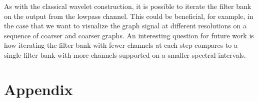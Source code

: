 \documentclass[journal, 10pt]{IEEEtran}
\begin{document}
As with the classical wavelet construction, it is possible to iterate the filter bank on the output from the lowpass channel.
This could be beneficial, for example, in the case that we want to visualize the graph signal at different resolutions on  a sequence of coarser and coarser graphs. An interesting question for future work is how iterating the filter bank with fewer channels at each step compares to a single filter bank with more channels %
supported on a smaller spectral intervals. %


\section{Appendix}
\end{document}

